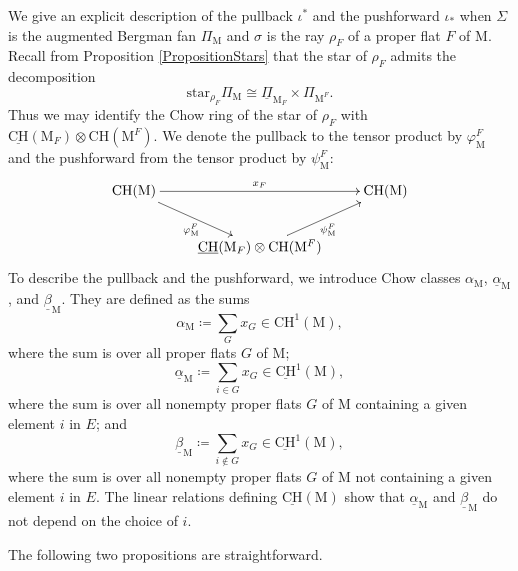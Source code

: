 \documentclass[11pt,reqno]{amsart}
\theoremstyle{definition}
\theoremstyle{remark}
\renewcommand{\(}{\left(}
\renewcommand{\)}{\right)}
\newcommand{\<}{\left<}
\renewcommand{\>}{\right>}
\newcommand{\CH}{\operatorname{CH}}
\begin{document}
We give an explicit description of the pullback $\iota^*$ and the pushforward $\iota_*$ when $\Sigma$ is the augmented Bergman fan $\Pi_\mathrm{M}$ and $\sigma$ is the ray $\rho_F$ of a proper flat $F$ of $\mathrm{M}$.
Recall from Proposition \ref{PropositionStars}  that the star of $\rho_F$ admits the decomposition
\[
 \text{star}_{\rho_F} \Pi_\mathrm{M} \cong \underline{\Pi}_{\mathrm{M}_{F}}\times \Pi_{\mathrm{M}^F}.
\]
Thus we may identify the Chow ring of the star of $\rho_F$ with $ \underline{\mathrm{CH}}(\mathrm{M}_F)\otimes \mathrm{CH}(\mathrm{M}^F)$.
We denote the  pullback to the tensor product by $\varphi_\mathrm{M}^F$ and the pushforward  from the tensor product by $\psi_\mathrm{M}^F$:
\[
\xymatrix{
\mathrm{CH}(\mathrm{M})  \ar[rr]^{x_F} \ar[dr]_{\varphi^F_\mathrm{M}}&&\mathrm{CH}(\mathrm{M}) 
\\
& \underline{\mathrm{CH}}(\mathrm{M}_F)\otimes \mathrm{CH}(\mathrm{M}^F)  \ar[ur]_{\psi^F_\mathrm{M}}&
}
\]
To  describe the pullback and the pushforward, we introduce Chow classes $\alpha_{\mathrm{M}}$, $\underline{\alpha}_{\mathrm{M}}$, and $\underline{\beta}_{\mathrm{M}}$. %
They are defined as the sums
\[
\alpha_{\mathrm{M}} \coloneq \sum_G x_G \in \mathrm{CH}^1(\mathrm{M}),
\]
where the sum is over all proper flats $G$ of $\mathrm{M}$;
\[
\underline{\alpha}_{\mathrm{M}}\coloneq  \sum_{i \in G} x_G \in \underline{\mathrm{CH}}^1(\mathrm{M}),
\]
where the sum is over all nonempty proper flats $G$ of $\mathrm{M}$ containing a given element $i$ in $E$; and
\[
\underline{\beta}_{\mathrm{M}} \coloneq \sum_{i \notin G} x_G  \in \underline{\mathrm{CH}}^1(\mathrm{M}),
\]
where the sum is over all nonempty proper flats $G$ of $\mathrm{M}$ not containing a given element $i$ in $E$.
The linear relations defining $\underline{\mathrm{CH}}(\mathrm{M})$ show that  $\underline{\alpha}_{\mathrm{M}}$ and $\underline{\beta}_{\mathrm{M}}$ do not depend on the choice of $i$. 

The following two propositions are straightforward.
\end{document}

